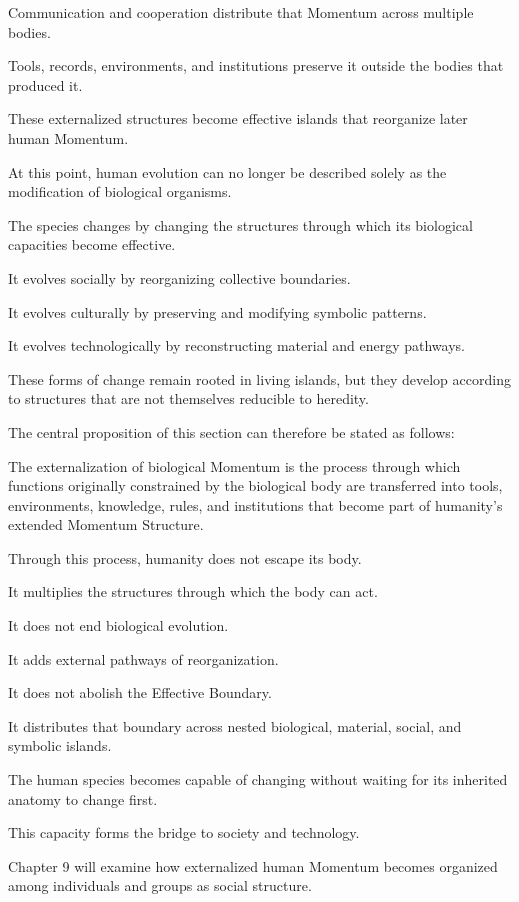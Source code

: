 Communication and cooperation distribute that Momentum across multiple bodies.

Tools, records, environments, and institutions preserve it outside the bodies that produced it.

These externalized structures become effective islands that reorganize later human Momentum.

At this point, human evolution can no longer be described solely as the modification of biological organisms.

The species changes by changing the structures through which its biological capacities become effective.

It evolves socially by reorganizing collective boundaries.

It evolves culturally by preserving and modifying symbolic patterns.

It evolves technologically by reconstructing material and energy pathways.

These forms of change remain rooted in living islands, but they develop according to structures that are not themselves reducible to heredity.

The central proposition of this section can therefore be stated as follows:

The externalization of biological Momentum is the process through which functions originally constrained by the biological body are transferred into tools, environments, knowledge, rules, and institutions that become part of humanity’s extended Momentum Structure.

Through this process, humanity does not escape its body.

It multiplies the structures through which the body can act.

It does not end biological evolution.

It adds external pathways of reorganization.

It does not abolish the Effective Boundary.

It distributes that boundary across nested biological, material, social, and symbolic islands.

The human species becomes capable of changing without waiting for its inherited anatomy to change first.

This capacity forms the bridge to society and technology.

Chapter 9 will examine how externalized human Momentum becomes organized among individuals and groups as social structure.

